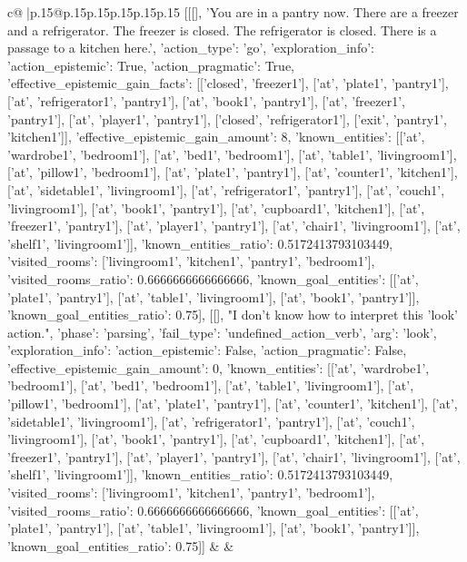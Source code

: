 \documentclass{article}
\begin{document}
{\begin{supertabular}{c@{$\;$}|p{.15\linewidth}@{}p{.15\linewidth}p{.15\linewidth}p{.15\linewidth}p{.15\linewidth}p{.15\linewidth}}
{{{	 [[[], 'You are in a pantry now. There are a freezer and a refrigerator. The freezer is closed. The refrigerator is closed. There is a passage to a kitchen here.', {'action_type': 'go', 'exploration_info': {'action_epistemic': True, 'action_pragmatic': True, 'effective_epistemic_gain_facts': [['closed', 'freezer1'], ['at', 'plate1', 'pantry1'], ['at', 'refrigerator1', 'pantry1'], ['at', 'book1', 'pantry1'], ['at', 'freezer1', 'pantry1'], ['at', 'player1', 'pantry1'], ['closed', 'refrigerator1'], ['exit', 'pantry1', 'kitchen1']], 'effective_epistemic_gain_amount': 8, 'known_entities': [['at', 'wardrobe1', 'bedroom1'], ['at', 'bed1', 'bedroom1'], ['at', 'table1', 'livingroom1'], ['at', 'pillow1', 'bedroom1'], ['at', 'plate1', 'pantry1'], ['at', 'counter1', 'kitchen1'], ['at', 'sidetable1', 'livingroom1'], ['at', 'refrigerator1', 'pantry1'], ['at', 'couch1', 'livingroom1'], ['at', 'book1', 'pantry1'], ['at', 'cupboard1', 'kitchen1'], ['at', 'freezer1', 'pantry1'], ['at', 'player1', 'pantry1'], ['at', 'chair1', 'livingroom1'], ['at', 'shelf1', 'livingroom1']], 'known_entities_ratio': 0.5172413793103449, 'visited_rooms': ['livingroom1', 'kitchen1', 'pantry1', 'bedroom1'], 'visited_rooms_ratio': 0.6666666666666666, 'known_goal_entities': [['at', 'plate1', 'pantry1'], ['at', 'table1', 'livingroom1'], ['at', 'book1', 'pantry1']], 'known_goal_entities_ratio': 0.75}}], [[], "I don't know how to interpret this 'look' action.", {'phase': 'parsing', 'fail_type': 'undefined_action_verb', 'arg': 'look', 'exploration_info': {'action_epistemic': False, 'action_pragmatic': False, 'effective_epistemic_gain_amount': 0, 'known_entities': [['at', 'wardrobe1', 'bedroom1'], ['at', 'bed1', 'bedroom1'], ['at', 'table1', 'livingroom1'], ['at', 'pillow1', 'bedroom1'], ['at', 'plate1', 'pantry1'], ['at', 'counter1', 'kitchen1'], ['at', 'sidetable1', 'livingroom1'], ['at', 'refrigerator1', 'pantry1'], ['at', 'couch1', 'livingroom1'], ['at', 'book1', 'pantry1'], ['at', 'cupboard1', 'kitchen1'], ['at', 'freezer1', 'pantry1'], ['at', 'player1', 'pantry1'], ['at', 'chair1', 'livingroom1'], ['at', 'shelf1', 'livingroom1']], 'known_entities_ratio': 0.5172413793103449, 'visited_rooms': ['livingroom1', 'kitchen1', 'pantry1', 'bedroom1'], 'visited_rooms_ratio': 0.6666666666666666, 'known_goal_entities': [['at', 'plate1', 'pantry1'], ['at', 'table1', 'livingroom1'], ['at', 'book1', 'pantry1']], 'known_goal_entities_ratio': 0.75}}]] 
	  } 
	   } 
	   } 
	 & & \\ 
 

    \theutterance {}  


\end{supertabular}}
\end{document}
